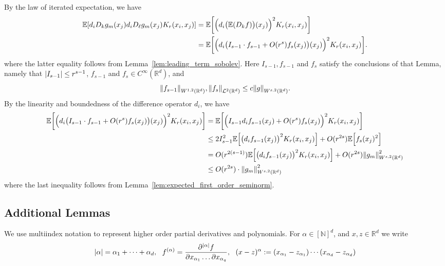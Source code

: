 \documentclass{article}
\newcommand{\Reals}{\mathbb{R}}
\newcommand{\1}{\mathbf{1}}
\newcommand{\Rd}{\Reals^d}
\newcommand{\Leb}{\mathcal{L}}
\newcommand{\Ebb}{\mathbb{E}}
\theoremstyle{alden}
\theoremstyle{aldenthm}
\theoremstyle{definition}
\theoremstyle{remark}
\begin{document}
By the law of iterated expectation, we have
\begin{align*}
\Ebb[d_iD_kg_m(x_j)d_iD_{\ell}g_m(x_j)K_r(x_i,x_j)] & = \Ebb\biggl[\Bigl(d_i\bigl(\Ebb(D_kf)\bigr)(x_j)\Bigr)^2K_r(x_i,x_j)\biggr] \\
& = \Ebb\biggl[\Bigl(d_i\bigl(I_{s - 1}\cdot f_{s - 1} + O(r^s)f_s(x_j)\bigr)(x_j)\Bigr)^2K_r(x_i,x_j)\biggr].
\end{align*}
where the latter equality follows from Lemma~\ref{lem:leading_term_sobolev}. Here $I_{s - 1}, f_{s -1}$ and $f_s$ satisfy the conclusions of that Lemma, namely that $\abs{I_{s - 1}} \leq r^{s - 1}$, $f_{s - 1}$ and $f_s \in C^{\infty}(\Rd)$, and
\begin{equation*}
\norm{f_{s - 1}}_{W^{1,2}(\Rd)}, \norm{f_s}_{\Leb^2(\Rd)} \leq c \norm{g}_{W^{s,2}(\Rd)}.
\end{equation*}
By the linearity and boundedness of the difference operator $d_i$, we have
\begin{align*}
\Ebb\biggl[\Bigl(d_i\bigl(I_{s - 1}\cdot f_{s - 1} + O(r^s)f_s(x_j)\bigr)(x_j)\Bigr)^2K_r(x_i,x_j)\biggr] & = \Ebb\biggl[\Bigl(I_{s - 1} d_if_{s - 1}(x_j) + O(r^s)f_s(x_j)\Bigr)^2K_r(x_i,x_j)\biggr] \\
& \leq 2I_{s - 1}^2 \Ebb\Bigl[\bigl(d_if_{s-1}(x_j)\bigr)^2K_r(x_i,x_j)\Bigr] + O(r^{2s})\Ebb\Bigl[f_s(x_j)^2\Bigr] \\
& = O(r^{2(s - 1)})\Ebb\Bigl[\bigl(d_if_{s-1}(x_j)\bigr)^2K_r(x_i,x_j)\Bigr] + O(r^{2s}) \norm{g_m}_{W^{s,2}(\Rd)}^2 \\
& \leq O(r^{2s}) \cdot \norm{g_m}_{W^{s,2}(\Rd)}^2
\end{align*}
where the last inequality follows from Lemma~\ref{lem:expected_first_order_seminorm}.

\subsection{Additional Lemmas}

We use multiindex notation to represent higher order partial derivatives and polynomials. For $\alpha \in [\mathbb{N}]^d$, and $x,z \in \Rd$ we write
\begin{equation*}
\abs{\alpha} = \alpha_1 + \cdots + \alpha_d,~~ f^{(\alpha)} = \frac{\partial^{\abs{\alpha}}f}{\partial x_{\alpha_1}\ldots \partial x_{\alpha_q}},~~ (x - z)^{\alpha} := (x_{\alpha_1} - z_{\alpha_1})\cdots(x_{\alpha_d} - z_{\alpha_d})
\end{equation*}
\end{document}
